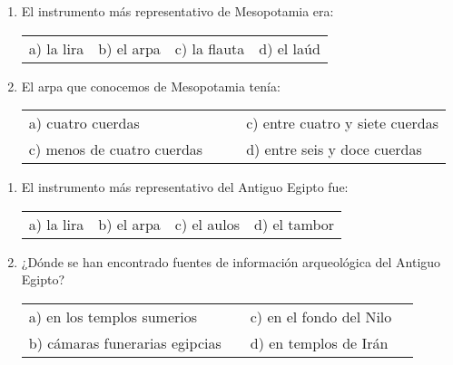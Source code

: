 \documentclass[letterpaper,12pt,notitlepage,spanish]{article}
\begin{document}
\begin{ejercicio}[] %
%
	\begin{enumerate}[1.-]
%
%
		\item El instrumento más representativo de Mesopotamia era: \par
%		
	\begin{tabular}{llll}
		a) la lira & b) el arpa & c) la flauta & d) el laúd\\
	\end{tabular}
%
%
%
		\item El arpa que conocemos de Mesopotamia tenía: \par
%		
	\begin{tabular}{llll}
		a) cuatro cuerdas & &  & c) entre cuatro y siete cuerdas\\
		c) menos de cuatro cuerdas & &  & d) entre seis y doce cuerdas\\
	\end{tabular}
%
%
	\end{enumerate}
%
\end{ejercicio} %
%
%
%
\begin{ejercicio}
	\begin{enumerate}
%
%
%		
		\item El instrumento más representativo del Antiguo Egipto fue: \par
%		
	\begin{tabular}{llll}
		a) la lira & b) el arpa & c) el aulos & d) el tambor\\
	\end{tabular}
%
%
%
		\item ¿Dónde se han encontrado fuentes de información arqueológica del Antiguo Egipto? \par
%		
	\begin{tabular}{llll}
		a) en los templos sumerios &  & c) en el fondo del Nilo & \\
		b) cámaras funerarias egipcias & & d) en templos de Irán
	\end{tabular}
%
%
	\end{enumerate}
\end{ejercicio}
\end{document}
